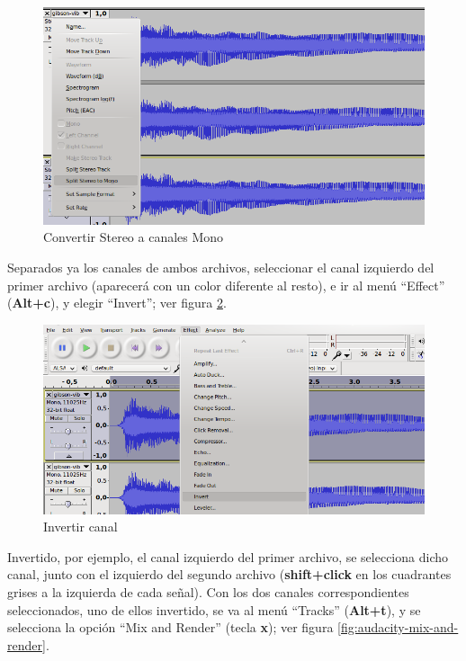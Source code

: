 \documentclass[a4paper,spanish,12pt]{article}
\begin{document}
\begin{figure}[H]
    \centering
    \includegraphics[scale=0.70]{imagenes/audacity-split-stereo.png}
    \caption{Convertir Stereo a canales Mono}
    \label{fig:audacity-split-stereo}
\end{figure}


Separados ya los canales de ambos archivos, seleccionar el canal izquierdo del primer archivo (aparecerá con un color diferente al resto), e ir al menú ``Effect'' (\textbf{Alt+c}), y elegir ``Invert''; ver figura \ref{fig:audacity-invert}.\vspace{\baselineskip}

\begin{figure}[H]
    \centering
    \includegraphics[scale=0.68]{imagenes/audacity-invert.png}
    \caption{Invertir canal}
    \label{fig:audacity-invert}
\end{figure}

Invertido, por ejemplo, el canal izquierdo del primer archivo, se selecciona dicho canal, junto con el izquierdo del segundo archivo (\textbf{shift+click} en los cuadrantes grises a la izquierda de cada señal). Con los dos canales correspondientes seleccionados, uno de ellos invertido, se va al menú ``Tracks'' (\textbf{Alt+t}), y se selecciona la opción ``Mix and Render'' (tecla \textbf{x}); ver figura \ref{fig:audacity-mix-and-render}.
\end{document}
